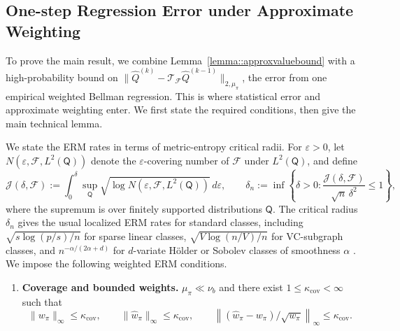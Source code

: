 \documentclass{article}
\theoremstyle{plain}
\theoremstyle{definition}
\theoremstyle{remark}
\begin{document}
 

\subsection{One-step Regression Error under Approximate Weighting}
\label{sec:theory:reg}

To prove the main result, we combine Lemma~\ref{lemma::approxvaluebound} with a
high-probability bound on
\(\|\widehat Q^{(k)}-\mathcal T_{\mathcal F}\widehat Q^{(k-1)}\|_{2,\mu_\pi}\),
the error from one empirical weighted Bellman regression. This is where
statistical error and approximate weighting enter. We first state the required
conditions, then give the main technical lemma.

We state the ERM rates in terms of metric-entropy critical radii. For
\(\varepsilon>0\), let
\(N(\varepsilon,\mathcal F,L^2(\mathsf Q))\) denote the
\(\varepsilon\)-covering number of \(\mathcal F\) under \(L^2(\mathsf Q)\), and
define
\[
\mathcal J(\delta,\mathcal F)
:=
\int_0^\delta
\sup_{\mathsf Q}
\sqrt{\log N(\varepsilon,\mathcal F,L^2(\mathsf Q))}\,d\varepsilon,
\qquad
\delta_n
:=
\inf\left\{
\delta>0:
\frac{\mathcal J(\delta,\mathcal F)}
{\sqrt n\,\delta^2}
\le 1
\right\},
\]
where the supremum is over finitely supported distributions \(\mathsf Q\). The
critical radius \(\delta_n\) gives the usual localized ERM rates for standard
classes, including
\(\sqrt{s\log(p/s)/n}\) for sparse linear classes,
\(\sqrt{V\log(n/V)/n}\) for VC-subgraph classes, and
\(n^{-\alpha/(2\alpha+d)}\) for \(d\)-variate Hölder or Sobolev classes of
smoothness \(\alpha\)
\citep{van1996weak,nickl2007bracketing,mendelson2010regularization,
wainwright2019high}. We impose the following weighted ERM conditions.


\begin{enumerate}[label=\textbf{C\arabic*}, ref={C\arabic*},
leftmargin=1.5em,resume=cond]
\item \label{cond::weight-coverage}
\textbf{Coverage and bounded weights.}
\(\mu_\pi \ll \nu_b\)  and there exist \(1 \leq \kappa_{\mathrm{cov}}  <\infty\) such that
\[
\|w_\pi\|_\infty\le \kappa_{\mathrm{cov}},
\qquad
\|\widehat w_\pi\|_\infty\le \kappa_{\mathrm{cov}},
\qquad
\left\|
(\widehat w_\pi-w_\pi) / \sqrt{w_\pi} \right\|_\infty
\le \kappa_{\mathrm{cov}} .
\]
\end{enumerate}
 
\end{document}
